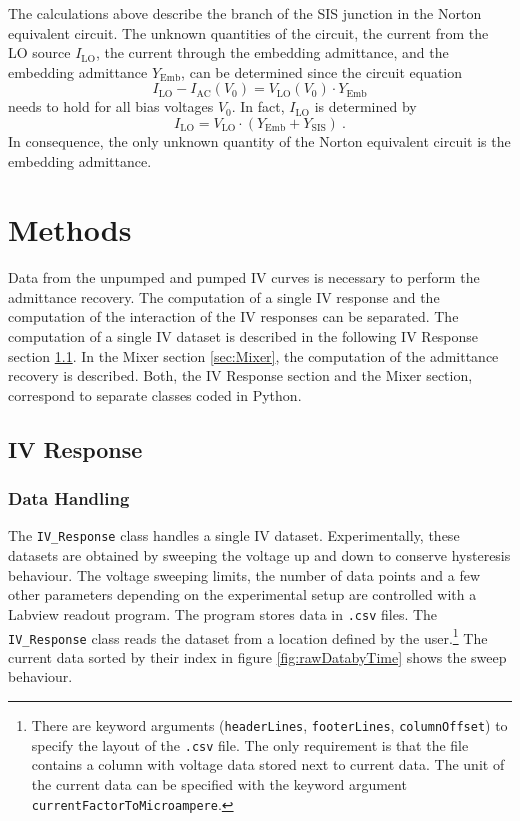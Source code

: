 \documentclass[]{article}
\begin{document}
The calculations above describe the branch of the SIS junction in the Norton equivalent circuit. The unknown quantities of the circuit, the current from the LO source $I_\text{LO}$, the current through the embedding admittance, and the embedding admittance $Y_\text{Emb}$, can be determined since the circuit equation 
\begin{equation}\label{eq:Circuit_Equation}
	I_\text{LO} - I_\text{AC}(V_0) =  V_\text{LO}(V_0)\cdot Y_\text{Emb}
\end{equation}
needs to hold for all bias voltages $V_0$. In fact, $I_\text{LO}$ is determined by 
\begin{equation}\label{eq:ILO_From_Circuit}
	I_\text{LO} = V_\text{LO}\cdot(Y_\text{Emb}+Y_\text{SIS})~.
\end{equation}
In consequence, the only unknown quantity of the Norton equivalent circuit is the embedding admittance.


\section{Methods}

Data from the unpumped and pumped IV curves is necessary to perform the admittance recovery. The computation of a single IV response and the computation of the interaction of the IV responses can be separated. The computation of a single IV dataset is described in the following IV Response section \ref{sec:IVResponse}. In the Mixer section \ref{sec:Mixer}, the computation of the admittance recovery is described. Both, the IV Response section and the Mixer section, correspond to separate classes coded in Python.

\subsection{IV Response} \label{sec:IVResponse}
\subsubsection{Data Handling}
The \texttt{IV\_Response} class handles a single IV dataset. Experimentally, these datasets are obtained by sweeping the voltage up and down to conserve hysteresis behaviour. The voltage sweeping limits, the number of data points and a few other parameters depending on the experimental setup are controlled with a Labview readout program. The program stores data in \texttt{.csv} files. The \texttt{IV\_Response} class reads the dataset from a location defined by the user.\footnote{There are keyword arguments (\texttt{headerLines}, \texttt{footerLines}, \texttt{columnOffset}) to specify the layout of the \texttt{.csv} file. The only requirement is that the file contains a column with voltage data stored next to current data. The unit of the current data can be specified with the keyword argument \texttt{currentFactorToMicroampere}.} The current data sorted by their index in figure \ref{fig:rawDatabyTime} shows the sweep behaviour.
\end{document}
